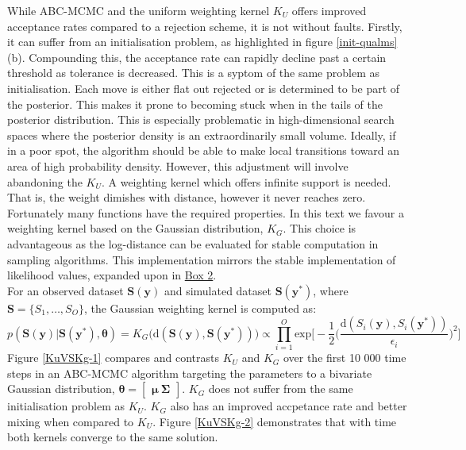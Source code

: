While ABC-MCMC and the uniform weighting kernel $K_U$ offers improved acceptance rates compared to a rejection scheme, it is not without faults. Firstly, it can suffer from an initialisation problem, as highlighted in figure \ref{init-qualms}(b). Compounding this, the acceptance rate can rapidly decline past a certain threshold as tolerance is decreased. This is a syptom of the same problem as initialisation. Each move is either flat out rejected or is determined to be part of the posterior. This makes it prone to becoming stuck when in the tails of the posterior distribution. This is especially problematic in high-dimensional search spaces where the posterior density is an extraordinarily small volume. Ideally, if in a poor spot, the algorithm should be able to make local transitions toward an area of high probability density. However, this adjustment will involve abandoning the $K_U$. A weighting kernel which offers infinite support is needed. That is, the weight dimishes with distance, however it never reaches zero. Fortunately many functions have the required properties. In this text we favour a  weighting kernel based on the Gaussian distribution, $K_G$. This choice is advantageous as the log-distance can be evaluated for stable computation in sampling algorithms. This implementation mirrors the stable implementation of likelihood values, expanded upon in \hyperref[Box2]{Box 2}.\\

For an observed dataset $\bm{S}(\bm{y})$ and simulated dataset $\bm{S}(\bm{y^*})$, where $\bm{S} = \{S_1,\dots,S_O\}$, the Gaussian weighting kernel is computed as:
\begin{equation}
p(\bm{S}(\bm{y})|\bm{S}(\bm{y^*}),\bm{\theta}) = K_G\big(\text{d}(\bm{S}(\bm{y}),\bm{S}(\bm{y^*}))\big) \propto \prod_{i = 1}^{O} \text{exp}\Big[-\frac{1}{2}\Big(\frac{\text{d}(S_i(\bm{y}),S_i(\bm{y^*}))}{\epsilon_i}\Big)^2\Big]
\end{equation}
Figure \ref{KuVSKg-1} compares and contrasts $K_U$ and $K_G$ over the first 10 000 time steps in an ABC-MCMC algorithm targeting the parameters to a bivariate Gaussian distribution, $\bm{\theta} = \begin{bmatrix}
\bm{\mu}\ \bm{\Sigma}
\end{bmatrix}$. $K_G$ does not suffer from the same initialisation problem as $K_U$. $K_G$ also has an improved accpetance rate and better mixing when compared to $K_U$. Figure \ref{KuVSKg-2} demonstrates that with time both kernels converge to the same solution.\\

